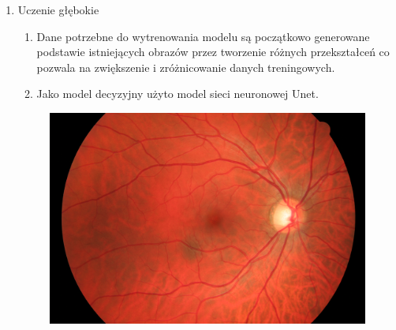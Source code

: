 \documentclass{article}
\begin{document}
\begin{enumerate}
\begin{enumerate}
              \item Uczenie głębokie
                    \begin{enumerate}
                        \item
                              Dane potrzebne do wytrenowania modelu są początkowo generowane
                              podstawie istniejących obrazów przez tworzenie różnych przekształceń
                              co pozwala na zwiększenie i zróżnicowanie danych treningowych.

                        \item Jako model decyzyjny użyto model sieci neuronowej Unet.
                    \end{enumerate}

                    \begin{figure}[h]
                        \centering
                        \begin{minipage}{0.4\textwidth}
                            \centering
                            \includegraphics[width=\linewidth]{../train-images/01_h.jpg}
                        \end{minipage}
                        \begin{minipage}{0.4\textwidth}
                            \centering

\end{minipage}
\end{figure}
\end{enumerate}
\end{enumerate}
\end{document}

